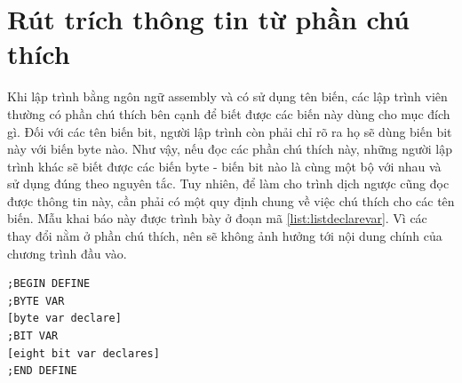 \section{Rút trích thông tin từ phần chú thích}
Khi lập trình bằng ngôn ngữ assembly và có sử dụng tên biến, các lập trình viên thường có phần chú thích bên cạnh để biết được các biến này dùng cho mục đích gì. Đối với các tên biến bit, người lập trình còn phải chỉ rõ ra họ sẽ dùng biến bit này với biến byte nào. Như vậy, nếu đọc các phần chú thích này, những người lập trình khác sẽ biết được các biến byte - biến bit nào là cùng một bộ với nhau và sử dụng đúng theo nguyên tắc. Tuy nhiên, để làm cho trình dịch ngược cũng đọc được thông tin này, cần phải có một quy định chung về việc chú thích cho các tên biến. Mẫu khai báo này được trình bày ở đoạn mã \ref{list:listdeclarevar}. Vì các thay đổi nằm ở phần chú thích, nên sẽ không ảnh hưởng tới nội dung chính của chương trình đầu vào.

\begin{lstlisting}[caption={Mẫu khai báo bộ biến},label={list:listdeclarevar}]
;BEGIN DEFINE
;BYTE VAR
[byte var declare]
;BIT VAR
[eight bit var declares]
;END DEFINE
\end{lstlisting}

